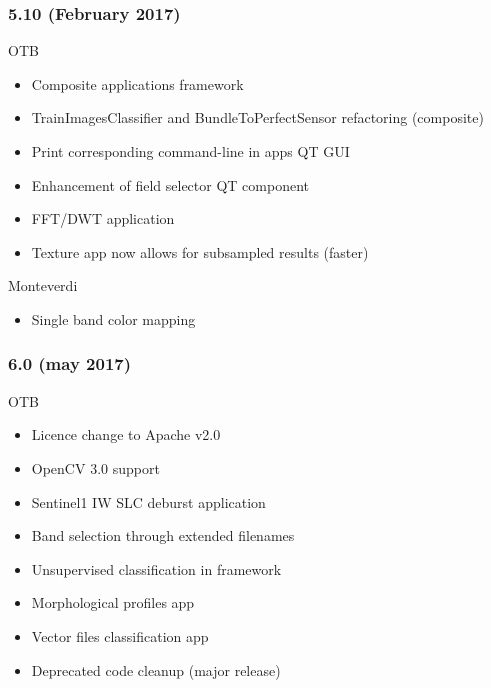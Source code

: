\documentclass[8pt]{beamer}
\begin{document}
\begin{frame}
  \frametitle{5.10 (February 2017)}
  \begin{block}{OTB}
    \begin{itemize}
      \item Composite applications framework 
      \item TrainImagesClassifier and BundleToPerfectSensor refactoring (composite)
      \item Print corresponding command-line in apps QT GUI
      \item Enhancement of field selector QT component
      \item FFT/DWT application
      \item Texture app now allows for subsampled results (faster)
    \end{itemize}
  \end{block}
  
  \begin{block}{Monteverdi}
    \begin{itemize}
      \item Single band color mapping
      \end{itemize}
  \end{block}
      
\end{frame}

\begin{frame}
  \frametitle{6.0 (may 2017)}
  \begin{block}{OTB}
    \begin{itemize}
      \item Licence change to  Apache v2.0
      \item OpenCV 3.0 support
      \item Sentinel1 IW SLC deburst application
      \item Band selection through extended filenames
      \item Unsupervised classification in framework
      \item Morphological profiles app
      \item Vector files classification app
      \item Deprecated code cleanup (major release)
    \end{itemize}
    \end{block}
\end{frame}
\end{document}
